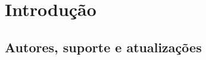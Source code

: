 \documentclass[]{ufsc-thesis-rn46-2019}
\begin{document}
\chapter{Introdução}
\label{ch:intro}


\section{Autores, suporte e atualizações}



\postextual

\end{document}

